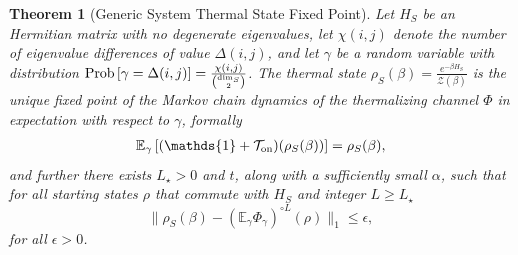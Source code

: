 \documentclass{article}
\newtheorem{theorem}{Theorem}
\newcommand{\on}{\rm on}
\newcommand{\norm}[1]{\| #1 \|}
\newcommand{\prob}[1]{{\rm Prob}\left[ #1 \right]}
\newcommand{\partfun}{\mathcal{Z}}
\newcommand{\identity}{\mathds{1}}
\begin{document}
\begin{theorem}[Generic System Thermal State Fixed Point]
    Let $H_S$ be an Hermitian matrix with no degenerate eigenvalues, let $\chi(i,j)$ denote the number of eigenvalue differences of value $\Delta(i,j)$, and let $\gamma$ be a random variable with distribution $\prob{\gamma = \Delta(i,j)} = \frac{\chi(i,j)}{\binom{\dim_S}{2}}$. The thermal state $\rho_S(\beta) = \frac{e^{-\beta H_S}}{\partfun(\beta)}$ is the unique fixed point of the Markov chain dynamics of the thermalizing channel $\Phi$ in expectation with respect to $\gamma$, formally
    \begin{align}
        \mathbb{E}_{\gamma} \left[ (\identity + \mathcal{T}_{\on})(\rho_S(\beta)) \right] = \rho_S(\beta),
    \end{align}
    and further there exists $L_\star>0$ and $t$, along with a sufficiently small $\alpha$, such that for all starting states $\rho$ that commute with $H_S$ and integer $L\ge L_\star$
    \begin{equation}
    \norm{\rho_S(\beta) - (\mathbb{E}_\gamma \Phi_\gamma)^{\circ L}(\rho)}_1 \le \epsilon,
    \end{equation}
    for all $\epsilon > 0$.
\end{theorem}
\end{document}
